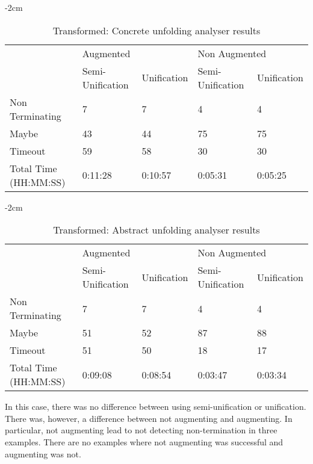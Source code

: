 \begin{table}[ht]
    \centering
    \addtolength{\leftskip} {-2cm}
    \addtolength{\rightskip}{-2cm}

    \begin{tabular}{|l|l|l|l|l|}
    \cline{2-5} 
    \multicolumn{1}{c|}{} & \multicolumn{2}{l|}{Augmented} & \multicolumn{2}{l|}{Non Augmented} \\ \cline{2-5} 
    \multicolumn{1}{c|}{} & Semi-Unification & Unification & Semi-Unification & Unification \\ \hline
    Non Terminating & 7 & 7 & 4 & 4 \\ \hline
    Maybe & 43 & 44 & 75 & 75\\ \hline
    Timeout & 59 & 58 & 30 & 30 \\ \hline
    Total Time (HH:MM:SS) & 0:11:28 & 0:10:57 & 0:05:31 & 0:05:25 \\ \hline
    \end{tabular}
    \caption{Transformed: Concrete unfolding analyser results}
\label{tab:hot:conc}

\end{table}
\begin{table}[ht]
    \centering
    \addtolength{\leftskip} {-2cm}
    \addtolength{\rightskip}{-2cm}

    \begin{tabular}{|l|l|l|l|l|}
    \cline{2-5} 
    \multicolumn{1}{c|}{} & \multicolumn{2}{l|}{Augmented} & \multicolumn{2}{l|}{Non Augmented} \\ \cline{2-5} 
    \multicolumn{1}{c|}{} & Semi-Unification & Unification & Semi-Unification & Unification \\ \hline
    Non Terminating & 7 & 7 & 4 & 4 \\ \hline
    Maybe & 51 & 52 & 87 & 88 \\ \hline
    Timeout & 51 & 50 & 18 & 17 \\ \hline
    Total Time (HH:MM:SS) & 0:09:08 & 0:08:54 & 0:03:47 & 0:03:34 \\ \hline
    \end{tabular}
    \caption{Transformed: Abstract unfolding analyser results}
    \label{tab:hot:abst}
\end{table}

In this case, there was no difference between using semi-unification or unification. There was, however, a difference between not augmenting and augmenting. In particular, not augmenting lead to not detecting non-termination in three examples. There are no examples where not augmenting was successful and augmenting was not.